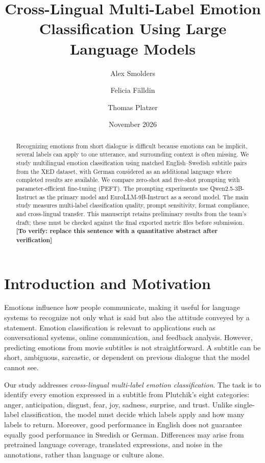 \documentclass[11pt,a4paper]{article}
\title{Cross-Lingual Multi-Label Emotion Classification Using Large Language Models}
\author{Alex Smolders \and Felicia F\"alldin \and Thomas Platzer}
\date{November 2026}
\newcommand{\todo}[1]{\textcolor{red!65!black}{\textbf{[To verify: #1]}}}
\begin{document}
\maketitle

\begin{abstract}
Recognizing emotions from short dialogue is difficult because emotions can be implicit, several labels can apply to one utterance, and surrounding context is often missing. We study multilingual emotion classification using matched English--Swedish subtitle pairs from the XED dataset, with German considered as an additional language where completed results are available. We compare zero-shot and five-shot prompting with parameter-efficient fine-tuning (PEFT). The prompting experiments use Qwen2.5-3B-Instruct as the primary model and EuroLLM-9B-Instruct as a second model. The main study measures multi-label classification quality, prompt sensitivity, format compliance, and cross-lingual transfer. This manuscript retains preliminary results from the team's draft; these must be checked against the final exported metric files before submission. \todo{replace this sentence with a quantitative abstract after verification}
\end{abstract}

\section{Introduction and Motivation}
Emotions influence how people communicate, making it useful for language systems to recognize not only what is said but also the attitude conveyed by a statement. Emotion classification is relevant to applications such as conversational systems, online communication, and feedback analysis. However, predicting emotions from movie subtitles is not straightforward. A subtitle can be short, ambiguous, sarcastic, or dependent on previous dialogue that the model cannot see.

Our study addresses \emph{cross-lingual multi-label emotion classification}. The task is to identify every emotion expressed in a subtitle from Plutchik's eight categories: anger, anticipation, disgust, fear, joy, sadness, surprise, and trust. Unlike single-label classification, the model must decide which labels apply and how many labels to return. Moreover, good performance in English does not guarantee equally good performance in Swedish or German. Differences may arise from pretrained language coverage, translated expressions, and noise in the annotations, rather than language or culture alone.
\end{document}
